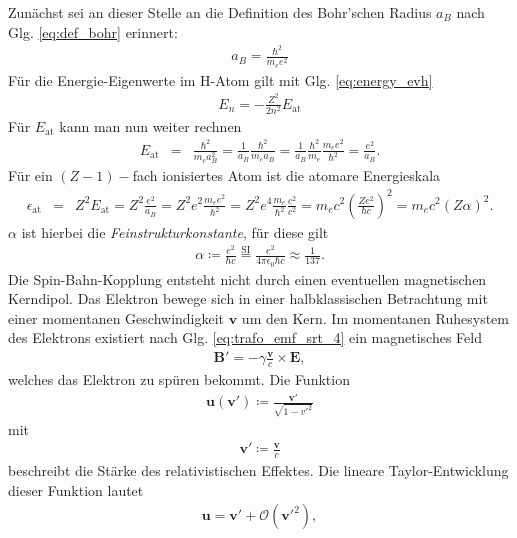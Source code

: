 \documentclass{book}
\begin{document}
Zunächst sei an dieser Stelle an die Definition des Bohr'schen Radius $a_B$ nach Glg. \eqref{eq:def_bohr} erinnert:
%
\begin{eqnarray}
a_B = \frac{\hbar^2}{m_ee^2}
\end{eqnarray}
%
Für die Energie-Eigenwerte im H-Atom gilt mit Glg. \eqref{eq:energy_evh}
%
\begin{eqnarray}
E_n = -\frac{Z^2}{2n^2}E_{\text{at}}
\end{eqnarray}
%
Für $E_{\text{at}}$ kann man nun weiter rechnen
%
\begin{eqnarray}
E_{\text{at}} & = & \frac{\hbar^2}{m_ea_B^2} = \frac{1}{a_B}\frac{\hbar^2}{m_ea_B} = \frac{1}{a_B}\frac{\hbar^2}{m_e}\frac{m_ee^2}{\hbar^2} = \frac{e^2}{a_B}.
\end{eqnarray}
%
Für ein $\left(Z - 1\right)-$fach ionisiertes Atom ist die atomare Energieskala
%
\begin{eqnarray}
\epsilon_{\text{at}} & = & Z^2E_{\text{at}} = Z^2\frac{e^2}{a_B} = Z^2e^2\frac{m_ee^2}{\hbar^2} = Z^2e^4\frac{m_e}{\hbar^2}\frac{c^2}{c^2} = m_ec^2\left(\frac{Ze^2}{\hbar c}\right)^2 = m_ec^2\left(Z\alpha\right)^2.
\end{eqnarray}
%
$\alpha$ ist hierbei die \textit{Feinstrukturkonstante}, für diese gilt
%
\begin{eqnarray}
\alpha \coloneqq\frac{e^2}{\hbar c}\stackrel{\text{SI}}{=}\frac{e^2}{4\pi\epsilon_0\hbar c}\approx\frac{1}{137}.
\end{eqnarray}
%
Die Spin-Bahn-Kopplung entsteht nicht durch einen eventuellen magnetischen Kerndipol. Das Elektron bewege sich in einer halbklassischen Betrachtung mit einer momentanen Geschwindigkeit $\mathbf{v}$ um den Kern. Im momentanen Ruhesystem des Elektrons existiert nach Glg. \eqref{eq:trafo_emf_srt_4} ein magnetisches Feld
%
\begin{eqnarray}
\mathbf{B'} = -\gamma\frac{\mathbf{v}}{c}\times\mathbf{E}, 
\end{eqnarray}
%
welches das Elektron zu spüren bekommt. Die Funktion
%
\begin{eqnarray}
\mathbf{u}\left(\mathbf{v'}\right) \coloneqq\frac{\mathbf{v'}}{\sqrt{1 - v'^2}}
\end{eqnarray}
%
mit
%
\begin{eqnarray}
\mathbf{v'} \coloneqq\frac{\mathbf{v}}{c}
\end{eqnarray}
%
beschreibt die Stärke des relativistischen Effektes. Die lineare Taylor-Entwicklung dieser Funktion lautet
%
\begin{eqnarray}
\mathbf{u} = \mathbf{v'} + \mathcal{O}\left(\mathbf{v'}^2\right), 
\end{eqnarray}
\end{document}
